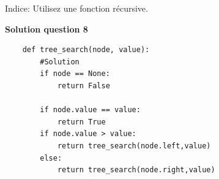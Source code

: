 \begin{Exercice}[15 minutes]
\begin{verbatim}
    \end{verbatim}

    \begin{conseil}
    Indice: Utilisez une fonction récursive.
    \end{conseil}

\textbf{Solution question 8}

    \begin{verbatim}
    def tree_search(node, value):
        #Solution
        if node == None:
            return False
        
        if node.value == value:
            return True
        if node.value > value:
            return tree_search(node.left,value)
        else:
            return tree_search(node.right,value) 
    
    \end{verbatim}

\end{Exercice}




